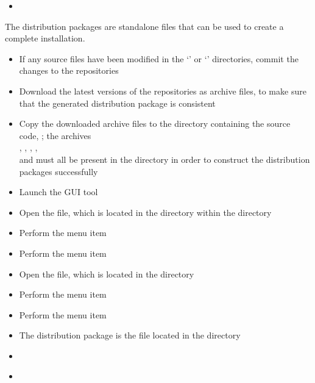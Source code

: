 \tertiaryEnd{}
\begin{itemize}
\item\TBD{}
\end{itemize}
\tertiaryEnd{}
\secondaryEnd{}
The distribution packages are standalone files that can be used to create a complete
\mplusm{} installation.
\begin{itemize}
\item If any source files have been modified in the `' or
`' directories, commit the changes to the
 repositories
\item\exSp{} Download the latest versions of the  repositories as 
archive files, to make sure that the generated distribution package is consistent
\item\exSp{} Copy the downloaded  archive files to the directory containing
the \mplusm{} source code, ; the archives\\
, ,
, ,\\
 and  must
all be present in the  directory in order to construct the distribution
packages successfully
\item\exSp{} Launch the  GUI tool
\item\exSp{} Open the  file, which is located in the
 directory within the  directory
\item\exSp{} Perform the menu item 
\item\exSp{} Perform the menu item 
\item\exSp{} Open the  file, which is located in the 
directory
\item\exSp{} Perform the menu item 
\item\exSp{} Perform the menu item 
\item\exSp{} The distribution package is the  file located in the
 directory
\end{itemize}
\tertiaryEnd{}
\begin{itemize}
\item\TBD{}
\end{itemize}
\tertiaryEnd{}
\begin{itemize}
\item\TBD{}
\end{itemize}
\tertiaryEnd{}
\secondaryEnd{}
\appendixEnd{}
